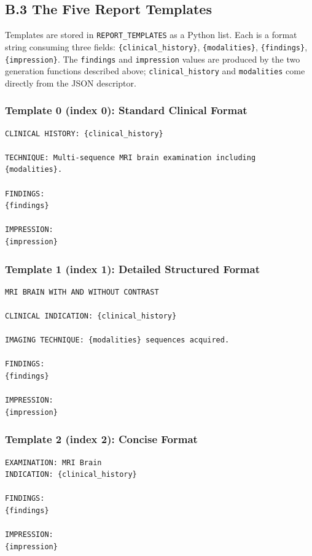 \documentclass[conference]{IEEEtran}
\begin{document}
\subsection*{B.3 The Five Report Templates}

Templates are stored in \texttt{REPORT\_TEMPLATES} as a Python list. Each is a format string consuming three fields: \texttt{\{clinical\_history\}}, \texttt{\{modalities\}}, \texttt{\{findings\}}, \texttt{\{impression\}}. The \texttt{findings} and \texttt{impression} values are produced by the two generation functions described above; \texttt{clinical\_history} and \texttt{modalities} come directly from the JSON descriptor.

\subsubsection*{Template 0 (index 0): Standard Clinical Format}

\begin{lstlisting}[style=reporttext]
CLINICAL HISTORY: {clinical_history}

TECHNIQUE: Multi-sequence MRI brain examination including {modalities}.

FINDINGS:
{findings}

IMPRESSION:
{impression}
\end{lstlisting}

\subsubsection*{Template 1 (index 1): Detailed Structured Format}

\begin{lstlisting}[style=reporttext]
MRI BRAIN WITH AND WITHOUT CONTRAST

CLINICAL INDICATION: {clinical_history}

IMAGING TECHNIQUE: {modalities} sequences acquired.

FINDINGS:
{findings}

IMPRESSION:
{impression}
\end{lstlisting}

\subsubsection*{Template 2 (index 2): Concise Format}

\begin{lstlisting}[style=reporttext]
EXAMINATION: MRI Brain
INDICATION: {clinical_history}

FINDINGS:
{findings}

IMPRESSION:
{impression}
\end{lstlisting}
\end{document}

